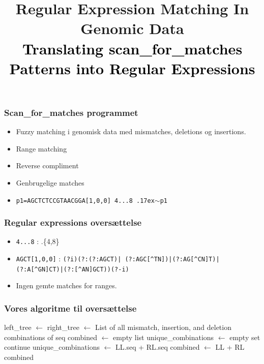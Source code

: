 \documentclass{beamer}
\title{
  Regular Expression Matching In Genomic Data \\
  \textcolor{black}{\tiny{Translating scan\_for\_matches Patterns into Regular Expressions}}
}
\date{}
\newcommand*\Let[2]{\State #1 $\gets$ #2}
\newcommand*\Returns[1]{\State \Return #1}
\begin{document}
\frame{\titlepage}

\begin{frame}
    \frametitle{Scan\_for\_matches programmet}
    
    \begin{itemize}
   		\item Fuzzy matching i genomisk data med mismatches, deletions og insertions.
   		\item Range matching
   		\item Reverse compliment
   		\item Genbrugelige matches
   		\item \texttt{p1=AGCTCTCCGTAACGGA[1,0,0] 4...8 {\raise.17ex\hbox{$\scriptstyle\mathtt{\sim}$}}p1}
	\end{itemize}    
   
\end{frame}

\begin{frame}
	\frametitle{Regular expressions oversættelse}
	
	\begin{itemize}
		\item \texttt{4...8} : .\{4,8\}
		\item \texttt{AGCT[1,0,0]} : \texttt{(?i)(?:(?:AGCT)|
		(?:AGC[\^{}TN])|(?:AG[\^{}CN]T)|
		(?:A[\^{}GN]CT)|(?:[\^{}AN]GCT))(?-i)}
		\item Ingen gemte matches for ranges.
	\end{itemize}
\end{frame}

\begin{frame}
	\frametitle{Vores algoritme til oversættelse}
	
\begin{algorithm}[H]
\tiny
  	\begin{algorithmic}[1]
    			\Let{left\_tree}{} \label{alg:divide:leftT}
    			\Let{right\_tree}{} \label{alg:divide:rightT}
    		\Else
    			\Returns{List of all mismatch, insertion, and deletion combinations of seq} \label{alg:divide:conquer}
    		\EndIf
    		\State
    		\Let{combined}{empty list}
    		\Let{unique\_combinations}{empty set}
    		 
    			 \label{alg:divide:inner} 
    				 \label{alg:divide:invariant1}
    					\State continue
    				\EndIf
    				 \label{alg:divide:invariant2}
    					\Let{unique\_combinations}{LL.seq + RL.seq}
    					\Let{combined}{LL + RL}
    				\EndIf
    			\EndFor
    		\EndFor
    		\Returns{combined}
    		\EndFunction
  	\end{algorithmic}
\end{algorithm}

\end{frame}
\end{document}

